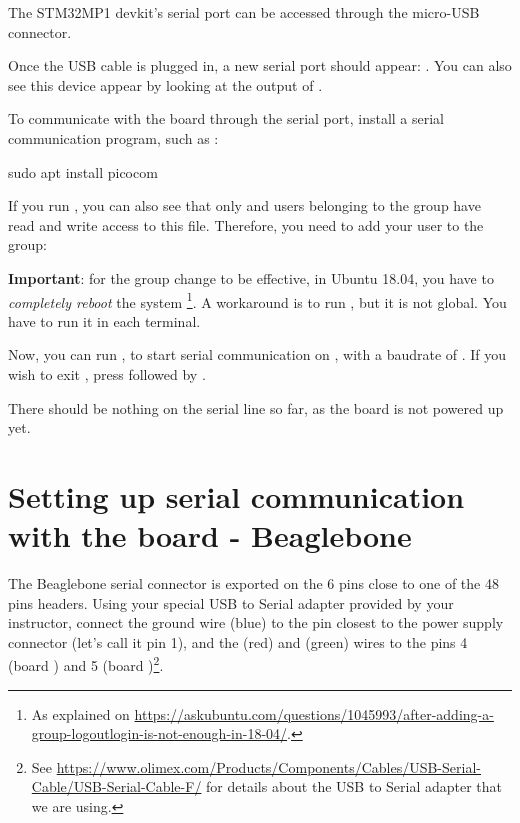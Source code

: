 The STM32MP1 devkit's serial port can be accessed through the micro-USB connector.

Once the USB cable is plugged in, a new serial port
should appear: .  You can also see this device
appear by looking at the output of .

To communicate with the board through the serial port, install a
serial communication program, such as :

\begin{bashinput}
sudo apt install picocom
\end{bashinput}

If you run , you can also see that only
 and users belonging to the  group have
read and write access to this file. Therefore, you need to add your user
to the  group:


{\bf Important}: for the group change to be effective, in Ubuntu 18.04, you have to
{\em completely reboot} the system \footnote{As explained on
\url{https://askubuntu.com/questions/1045993/after-adding-a-group-logoutlogin-is-not-enough-in-18-04/}.}.
A workaround is to run , but it is not global.
You have to run it in each terminal.

Now, you can run , to start serial
communication on , with a baudrate of . If
you wish to exit , press \code{[Ctrl][a]} followed by
\code{[Ctrl][x]}.

There should be nothing on the serial line so far, as the board is not
powered up yet.

\section{Setting up serial communication with the board - Beaglebone}

The Beaglebone serial connector is exported on the 6 pins close to one
of the 48 pins headers. Using your special USB to Serial adapter provided
by your instructor, connect the ground wire (blue) to the pin closest
to the power supply connector (let's call it pin 1), and the  (red)
and  (green) wires to the pins 4 (board ) and
5 (board )\footnote{See
\url{https://www.olimex.com/Products/Components/Cables/USB-Serial-Cable/USB-Serial-Cable-F/}
for details about the USB to Serial adapter that we are using.}.

